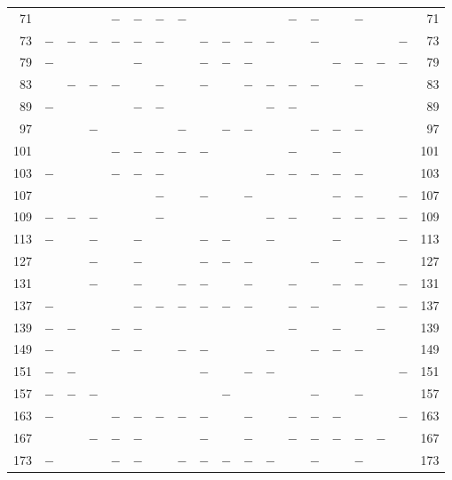 \begin{center}
\begin{tabular}{r|c|c|c|c|c|c|c|c|c|c|c|c|c|c|c|c|c|r}
71 &  &  &  & $-$ & $-$ & $-$ & $-$ &  &  &  &  & $-$ & $-$ &  & $-$ &  &  & 71\\
73 & $-$ & $-$ & $-$ & $-$ & $-$ & $-$ &  & $-$ & $-$ & $-$ & $-$ &  & $-$ &  &  &  & $-$ & 73\\
79 & $-$ &  &  &  & $-$ &  &  & $-$ & $-$ & $-$ &  &  &  & $-$ & $-$ & $-$ & $-$ & 79\\
83 &  & $-$ & $-$ & $-$ &  & $-$ &  & $-$ &  & $-$ & $-$ & $-$ & $-$ &  & $-$ &  &  & 83\\
89 & $-$ &  &  &  & $-$ & $-$ &  &  &  &  & $-$ & $-$ &  &  &  &  &  & 89\\
97 &  &  & $-$ &  &  &  & $-$ &  & $-$ & $-$ &  &  & $-$ & $-$ & $-$ &  &  & 97\\
101 &  &  &  & $-$ & $-$ & $-$ & $-$ & $-$ &  &  &  & $-$ &  & $-$ &  &  &  & 101\\
103 & $-$ &  &  & $-$ & $-$ & $-$ &  &  &  &  & $-$ & $-$ & $-$ & $-$ & $-$ &  &  & 103\\
107 &  &  &  &  &  & $-$ &  & $-$ &  & $-$ &  &  &  & $-$ & $-$ &  & $-$ & 107\\
109 & $-$ & $-$ & $-$ &  &  & $-$ &  &  &  &  & $-$ & $-$ &  & $-$ & $-$ & $-$ & $-$ & 109\\
113 & $-$ &  & $-$ &  & $-$ &  &  & $-$ & $-$ &  & $-$ &  &  & $-$ &  &  & $-$ & 113\\
127 &  &  & $-$ &  & $-$ &  &  & $-$ & $-$ & $-$ &  &  & $-$ &  & $-$ & $-$ &  & 127\\
131 &  &  & $-$ &  & $-$ &  & $-$ & $-$ &  & $-$ &  & $-$ &  & $-$ & $-$ &  & $-$ & 131\\
137 & $-$ &  &  &  & $-$ & $-$ & $-$ & $-$ & $-$ & $-$ &  & $-$ & $-$ &  &  & $-$ & $-$ & 137\\
139 & $-$ & $-$ &  & $-$ & $-$ &  &  &  &  &  &  & $-$ &  & $-$ &  & $-$ &  & 139\\
149 & $-$ &  &  & $-$ & $-$ &  & $-$ & $-$ &  &  & $-$ &  & $-$ & $-$ & $-$ &  &  & 149\\
151 & $-$ & $-$ &  &  &  &  &  & $-$ &  & $-$ & $-$ &  &  &  &  &  & $-$ & 151\\
157 & $-$ & $-$ & $-$ &  &  &  &  &  & $-$ &  &  &  & $-$ &  & $-$ &  &  & 157\\
163 & $-$ &  &  & $-$ & $-$ & $-$ & $-$ & $-$ &  & $-$ &  & $-$ & $-$ & $-$ &  &  & $-$ & 163\\
167 &  &  & $-$ & $-$ & $-$ &  &  & $-$ &  & $-$ &  & $-$ & $-$ & $-$ & $-$ & $-$ &  & 167\\
173 & $-$ &  &  & $-$ & $-$ &  & $-$ & $-$ & $-$ & $-$ & $-$ &  & $-$ &  & $-$ &  &  & 173\\

\end{tabular}
\end{center}
